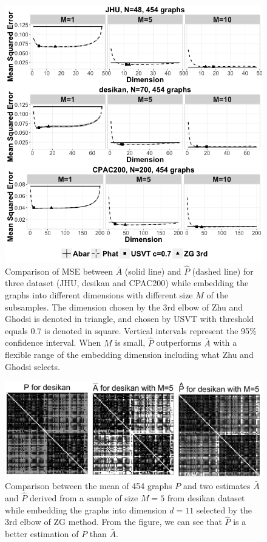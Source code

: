 \documentclass[a4paper]{article}
\begin{document}
\begin{figure}[!htb]
\centering
\includegraphics[width=1\textwidth]{realdata.png}
\caption{Comparison of MSE between $\bar{A}$ (solid line) and $\hat{P}$ (dashed line) for three dataset (JHU, desikan and CPAC200) while embedding the graphs into different dimensions with different size $M$ of the subsamples. The dimension chosen by the 3rd elbow of Zhu and Ghodsi is denoted in triangle, and chosen by USVT with threshold equals 0.7 is denoted in square.  Vertical intervals represent the 95\% confidence interval.  When $M$ is small, $\hat{P}$ outperforms $\bar{A}$ with a flexible range of the embedding dimension including what Zhu and Ghodsi selects.}
\label{fig:realdata}
\end{figure}




\begin{figure}[!htb]
\centering
\includegraphics[width=1\textwidth]{Matrix_desikan_m5.png}
\caption{Comparison between the mean of 454 graphs $P$ and two estimates $\bar{A}$ and $\hat{P}$ derived from a sample of size $M=5$ from desikan dataset while embedding the graphs into dimension $d=11$ selected by the 3rd elbow of ZG method. From the figure, we can see that $\hat{P}$ is a better estimation of $P$ than $\bar{A}$.}
\label{fig:Matrix_desikan_m5}
\end{figure}
\end{document}
